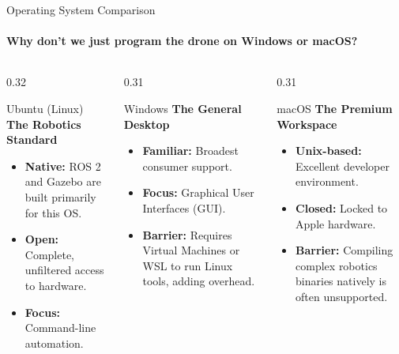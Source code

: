 \begin{frame}{Operating System Comparison}
\framesubtitle{Why don't we just program the drone on Windows or macOS?}

\footnotesize
\begin{columns}[T,onlytextwidth]

    \begin{column}{0.32\textwidth}
        \begin{exampleblock}{Ubuntu (Linux)}
            \textbf{The Robotics Standard}
            \begin{itemize}
                \setlength{\itemsep}{0.2em}
                \item \textbf{Native:} ROS 2 and Gazebo are built primarily for this OS.
                \item \textbf{Open:} Complete, unfiltered access to hardware.
                \item \textbf{Focus:} Command-line automation.
            \end{itemize}
        \end{exampleblock}
    \end{column}

    \begin{column}{0.31\textwidth}
        \begin{block}{Windows}
            \textbf{The General Desktop}
            \begin{itemize}
                \setlength{\itemsep}{0.2em}
                \item \textbf{Familiar:} Broadest consumer support.
                \item \textbf{Focus:} Graphical User Interfaces (GUI).
                \item \textbf{Barrier:} Requires Virtual Machines or WSL to run Linux tools, adding overhead.
            \end{itemize}
        \end{block}
    \end{column}

    \begin{column}{0.31\textwidth}
        \begin{block}{macOS}
            \textbf{The Premium Workspace}
            \begin{itemize}
                \setlength{\itemsep}{0.2em}
                \item \textbf{Unix-based:} Excellent developer environment.
                \item \textbf{Closed:} Locked to Apple hardware.
                \item \textbf{Barrier:} Compiling complex robotics binaries natively is often unsupported.
            \end{itemize}
        \end{block}
    \end{column}


\end{columns}
\end{frame}
